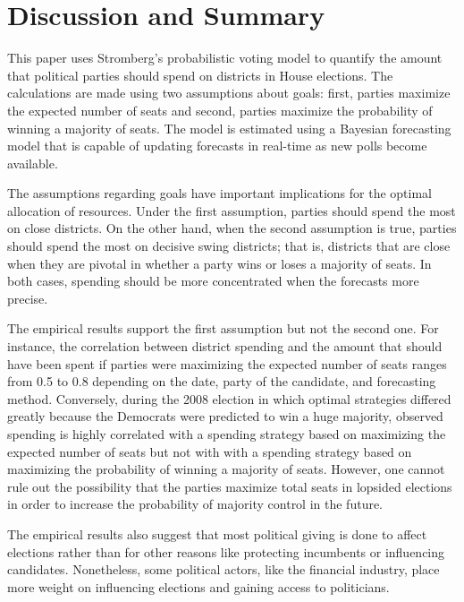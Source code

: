 \documentclass[12pt,final,fleqn]{article}
\theoremstyle{plain}
\begin{document}
\section{Discussion and Summary}
This paper uses Stromberg's \citeyear{stromberg2008electoral} probabilistic voting model to quantify the amount that political parties should spend on districts in House elections. The calculations are made using two assumptions about goals: first, parties maximize the expected number of seats and second, parties maximize the probability of winning a majority of seats. The model is estimated using a Bayesian forecasting model that is capable of updating forecasts in real-time as new polls become available.

The assumptions regarding goals have important implications for the optimal allocation of resources. Under the first assumption, parties should spend the most on close districts. On the other hand, when the second assumption is true, parties should spend the most on decisive swing districts; that is, districts that are close when they are pivotal in whether a party wins or loses a majority of seats. In both cases, spending should be more concentrated when the forecasts more precise. 

The empirical results support the first assumption but not the second one. For instance, the correlation between district spending and the amount that should have been spent if parties were maximizing the expected number of seats ranges from 0.5 to 0.8 depending on the date, party of the candidate, and forecasting method. Conversely, during the 2008 election in which optimal strategies differed greatly because the Democrats were predicted to win a huge majority, observed spending is highly correlated with a spending strategy based on maximizing the expected number of seats but not with with a spending strategy based on maximizing the probability of winning a majority of seats. However, one cannot rule out the possibility that the parties maximize total seats in lopsided elections in order to increase the probability of majority control in the future. 

The empirical results also suggest that most political giving is done to affect elections rather than for other reasons like protecting incumbents or influencing candidates. Nonetheless, some political actors, like the financial industry, place more weight on influencing elections and gaining access to politicians.
\end{document}

